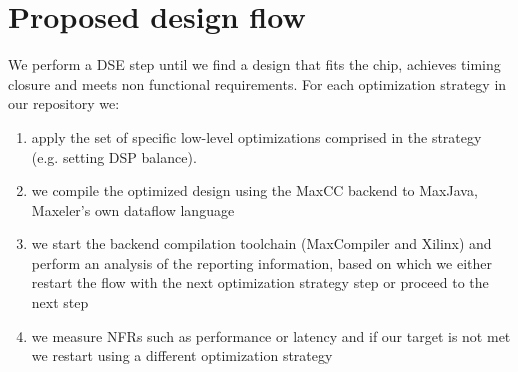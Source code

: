 \documentclass[conference]{IEEEtran}
\begin{document}
\section{Proposed design flow}

We perform a DSE step until we find a design that fits the chip,
achieves timing closure and meets non functional requirements.  For
each optimization strategy in our repository we:

\begin{enumerate}

\item apply the set of specific low-level optimizations comprised in
  the strategy (e.g. setting DSP balance).

\item  we compile the optimized
  design using the MaxCC backend to MaxJava, Maxeler's own dataflow
  language

\item we start the backend compilation toolchain (MaxCompiler
  and Xilinx) and perform an analysis of the reporting information,
  based on which we either restart the flow with the next optimization
  strategy step or proceed to the next step

\item we measure NFRs such as performance or latency and if our target
  is not met we restart using a different optimization strategy

\end{enumerate}
\end{document}

